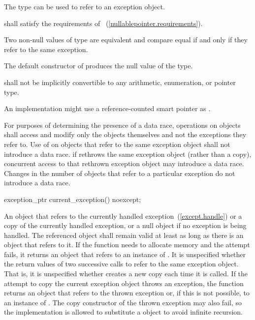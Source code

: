 \begin{itemdescr}
\pnum
The type  can be used to refer to an exception object.

\pnum
{} shall satisfy the requirements of
~(\ref{nullablepointer.requirements}).

\pnum
Two non-null values of type  are equivalent and compare equal if and
only if they refer to the same exception.

\pnum
The default constructor of  produces the null value of the
type.

\pnum
{} shall not be implicitly convertible to any arithmetic,
enumeration, or pointer type.

\pnum
\enternote An implementation might use a reference-counted smart
pointer as . \exitnote

\pnum
For purposes of determining the presence of a data race, operations on
 objects shall access and modify only the
 objects themselves and not the exceptions they refer to.
Use of  on  objects that refer to
the same exception object shall not introduce a data race. \enternote if
 rethrows the same exception object (rather than a copy),
concurrent access to that rethrown exception object may introduce a data race.
Changes in the number of  objects that refer to a
particular exception do not introduce a data race. \exitnote
\end{itemdescr}

\begin{itemdecl}
exception_ptr current_exception() noexcept;
\end{itemdecl}

\begin{itemdescr}
\pnum
\returns An  object that refers to
the currently handled exception~(\ref{except.handle}) or a copy of the currently
handled exception, or a null  object if no exception is being
handled. The referenced object shall remain valid at least as long as there is an
 object that refers to it.
If the function needs to allocate memory and the attempt fails, it returns an
 object that refers to an instance of .
It is unspecified whether the return values of two successive calls to
 refer to the same exception object.
\enternote That is, it is unspecified whether 
creates a new copy each time it is called. \exitnote
If the attempt to copy the current exception object throws an exception, the function
returns an  object that refers to the thrown exception or,
if this is not possible, to an instance of . \enternote The
copy constructor of the thrown exception may also fail, so the implementation is allowed
to substitute a  object to avoid infinite
recursion.\exitnote
\end{itemdescr}

